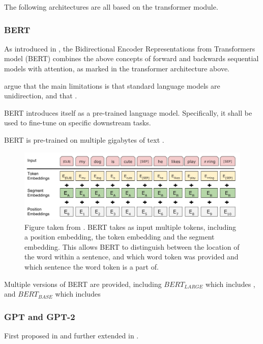 \documentclass[a4paper,12pt,twoside,openright]{report}
\begin{document}
The following architectures are all based on the transformer module.

\subsubsection{BERT}

As introduced in \cite{devlin18}, the Bidirectional Encoder Representations from Transformers model (BERT) combines the above concepts of forward and backwards sequential models with attention, as marked in the transformer architecture above.

\cite{devlin18} argue that the main limitations is that standard language models are unidirection, and that .

BERT introduces itself as a pre-trained language model.
Specifically, it shall be used to fine-tune on specific downstream tasks.

BERT is pre-trained on %
multiple gigabytes of text .



\begin{figure}[h]
	\center
  \includegraphics[width=0.6\linewidth]{./assets/background/BERT_multiple_input_tokens.png}
  \caption{Figure taken from \cite{devlin18}. BERT takes as input multiple tokens, including a position embedding, the token embedding and the segment embedding. This allows BERT to distinguish between the location of the word within a sentence, and which word token was provided and which sentence the word token is a part of.}
  \label{fig:cbow_skipgram}
\end{figure}


Multiple versions of BERT are provided, including $BERT_{LARGE}$ which includes %
, and $BERT_{BASE}$ which includes %


\subsubsection{GPT and GPT-2}

First proposed in \cite{radford18} and further extended in \cite{radford19}.
\end{document}
